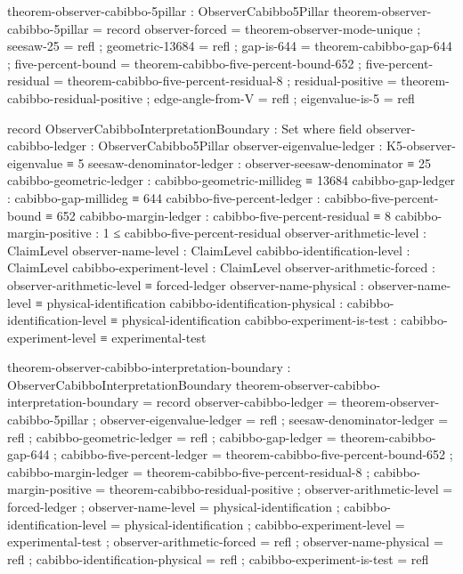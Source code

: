\documentclass[11pt,a4paper]{book}
\begin{document}
\begin{code}
theorem-observer-cabibbo-5pillar : ObserverCabibbo5Pillar
theorem-observer-cabibbo-5pillar = record
  { observer-forced   = theorem-observer-mode-unique
  ; seesaw-25         = refl
  ; geometric-13684   = refl
  ; gap-is-644        = theorem-cabibbo-gap-644
  ; five-percent-bound = theorem-cabibbo-five-percent-bound-652
  ; five-percent-residual = theorem-cabibbo-five-percent-residual-8
  ; residual-positive = theorem-cabibbo-residual-positive
  ; edge-angle-from-V = refl
  ; eigenvalue-is-5   = refl }

record ObserverCabibboInterpretationBoundary : Set where
  field
    observer-cabibbo-ledger       : ObserverCabibbo5Pillar
    observer-eigenvalue-ledger    : K5-observer-eigenvalue ≡ 5
    seesaw-denominator-ledger     : observer-seesaw-denominator ≡ 25
    cabibbo-geometric-ledger      : cabibbo-geometric-millideg ≡ 13684
    cabibbo-gap-ledger            : cabibbo-gap-millideg ≡ 644
    cabibbo-five-percent-ledger   : cabibbo-five-percent-bound ≡ 652
    cabibbo-margin-ledger         : cabibbo-five-percent-residual ≡ 8
    cabibbo-margin-positive       : 1 ≤ cabibbo-five-percent-residual
    observer-arithmetic-level     : ClaimLevel
    observer-name-level           : ClaimLevel
    cabibbo-identification-level  : ClaimLevel
    cabibbo-experiment-level      : ClaimLevel
    observer-arithmetic-forced    : observer-arithmetic-level ≡ forced-ledger
    observer-name-physical        : observer-name-level ≡ physical-identification
    cabibbo-identification-physical : cabibbo-identification-level ≡ physical-identification
    cabibbo-experiment-is-test    : cabibbo-experiment-level ≡ experimental-test

theorem-observer-cabibbo-interpretation-boundary : ObserverCabibboInterpretationBoundary
theorem-observer-cabibbo-interpretation-boundary = record
  { observer-cabibbo-ledger        = theorem-observer-cabibbo-5pillar
  ; observer-eigenvalue-ledger     = refl
  ; seesaw-denominator-ledger      = refl
  ; cabibbo-geometric-ledger       = refl
  ; cabibbo-gap-ledger             = theorem-cabibbo-gap-644
  ; cabibbo-five-percent-ledger    = theorem-cabibbo-five-percent-bound-652
  ; cabibbo-margin-ledger          = theorem-cabibbo-five-percent-residual-8
  ; cabibbo-margin-positive        = theorem-cabibbo-residual-positive
  ; observer-arithmetic-level      = forced-ledger
  ; observer-name-level            = physical-identification
  ; cabibbo-identification-level   = physical-identification
  ; cabibbo-experiment-level       = experimental-test
  ; observer-arithmetic-forced     = refl
  ; observer-name-physical         = refl
  ; cabibbo-identification-physical = refl
  ; cabibbo-experiment-is-test     = refl }
\end{code}
\end{document}
